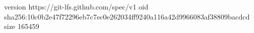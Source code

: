 version https://git-lfs.github.com/spec/v1
oid sha256:10c0b2e47f72296eb7c7ec0e262034ff9240a116a42d9966083af38809bacdcd
size 165459
